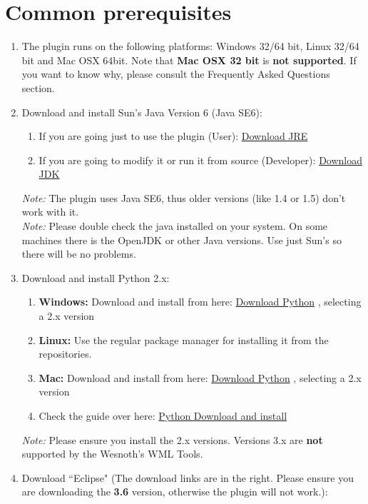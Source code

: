 \documentclass[10pt]{article}
\begin{document}
\section{Common prerequisites}
\begin{enumerate}
\item The plugin runs on the following platforms: Windows 32/64 bit, Linux 32/64 bit and Mac OSX 64bit. Note that \textbf{Mac OSX 32 bit} is \textbf{not supported}. If you want to know why, please consult the Frequently Asked Questions section.
\item Download and install Sun's Java Version 6 (Java SE6):
\begin{enumerate}
\item If you are going just to use the plugin (User): \href{https://cds.sun.com/is-bin/INTERSHOP.enfinity/WFS/CDS-CDS_Developer-Site/en_US/-/USD/ViewProductDetail-Start?ProductRef=jre-6u21-oth-JPR@CDS-CDS_Developer}{Download JRE}
\item If you are going to modify it or run it from source (Developer): \href{http://java.sun.com/javase/downloads/widget/jdk6.jsp}{Download JDK}
\end{enumerate}
\textit{Note:} The plugin uses Java SE6, thus older versions (like 1.4 or 1.5) don't work with it.\\
\textit{Note:} Please double check the java installed on your system. On some machines there is the OpenJDK or other Java versions. Use just Sun's so there will be no problems.
\item Download and install Python 2.x:
\begin{enumerate}
\item \textbf{Windows:} Download and install from here: \href{http://python.org/download/}{Download Python} , selecting a 2.x version
\item \textbf{Linux:} Use the regular package manager for installing it from the repositories.
\item \textbf{Mac:} Download and install from here: \href{http://python.org/download/}{Download Python} , selecting a 2.x version
\item Check the guide over here: \href{http://wiki.python.org/moin/BeginnersGuide/Download}{Python Download and install} 
\end{enumerate}
\textit{Note:} Please ensure you install the 2.x versions. Versions 3.x are \textbf{not} supported by the Wesnoth's WML Tools.
\item Download ``Eclipse" (The download links are in the right. Please ensure you are downloading the \textbf{3.6} version, otherwise the plugin will not work.):

\end{enumerate}
\end{document}
